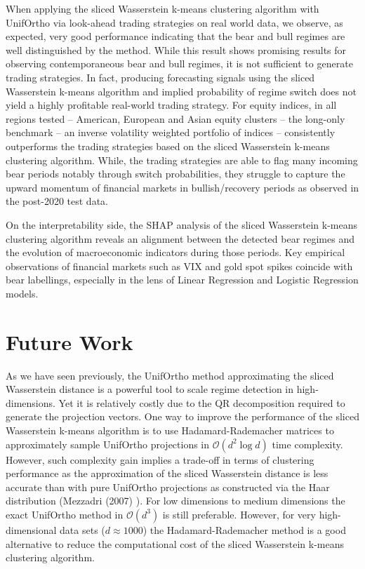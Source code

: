 \documentclass[12pt,a4paper]{report}
\begin{document}
When applying the sliced Wasserstein k-means clustering algorithm with UnifOrtho via look-ahead trading strategies on real world data, we observe, as expected, very good performance indicating that the bear and bull regimes are well distinguished by the method. 
While this result shows promising results for observing contemporaneous bear and bull regimes, it is not sufficient to generate trading strategies.
In fact, producing forecasting signals using the sliced Wasserstein k-means algorithm and implied probability of regime switch does not yield a highly profitable real-world trading strategy.
For equity indices, in all regions tested -- American, European and Asian equity clusters -- the long-only benchmark -- an inverse volatility weighted portfolio of indices -- consistently outperforms the trading strategies based on the sliced Wasserstein k-means clustering algorithm. 
While, the trading strategies are able to flag many incoming bear periods notably through switch probabilities, they struggle to capture the upward momentum of financial markets in bullish/recovery periods as observed in the post-2020 test data. 

On the interpretability side, the SHAP analysis of the sliced Wasserstein k-means clustering algorithm reveals an alignment between the detected bear regimes and the evolution of macroeconomic indicators during those periods. 
Key empirical observations of financial markets such as VIX and gold spot spikes coincide with bear labellings, especially in the lens of Linear Regression and Logistic Regression models.

\section{Future Work}
As we have seen previously, the UnifOrtho method approximating the sliced Wasserstein distance is a powerful tool to scale regime detection in high-dimensions. Yet it is relatively costly due to the QR decomposition required to generate the projection vectors.
One way to improve the performance of the sliced Wasserstein k-means algorithm is to use Hadamard-Rademacher matrices to approximately sample UnifOrtho projections in $\mathcal{O}(d^2\log d)$ time complexity.
  However, such complexity gain implies a trade-off in terms of clustering performance as the approximation of the sliced Wasserstein distance is less accurate than with pure UnifOrtho projections as constructed via the Haar distribution (Mezzadri (2007) \cite{Mezzadri2007}).
For low dimensions to medium dimensions the exact UnifOrtho method in $\mathcal{O}(d^3)$ is still preferable. However, for very high-dimensional data sets ($d\approx 1000$) the Hadamard-Rademacher method is a good alternative to reduce the computational cost of the sliced Wasserstein k-means clustering algorithm.
\end{document}
